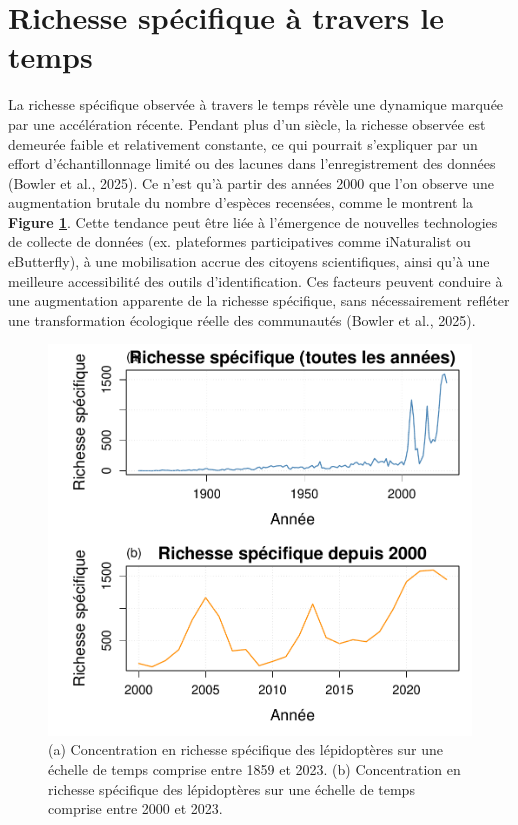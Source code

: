 \documentclass[9pt,twocolumn,twoside,]{pnas-new}
\begin{document}
\section*{Richesse spécifique à travers le
temps}\label{richesse-spuxe9cifique-uxe0-travers-le-temps}

La richesse spécifique observée à travers le temps révèle une dynamique
marquée par une accélération récente. Pendant plus d'un siècle, la
richesse observée est demeurée faible et relativement constante, ce qui
pourrait s'expliquer par un effort d'échantillonnage limité ou des
lacunes dans l'enregistrement des données (Bowler et al., 2025). Ce
n'est qu'à partir des années 2000 que l'on observe une augmentation
brutale du nombre d'espèces recensées, comme le montrent la
\textbf{Figure \ref{fig:fig_richesse_temporelle}}. Cette tendance peut
être liée à l'émergence de nouvelles technologies de collecte de données
(ex. plateformes participatives comme iNaturalist ou eButterfly), à une
mobilisation accrue des citoyens scientifiques, ainsi qu'à une meilleure
accessibilité des outils d'identification. Ces facteurs peuvent conduire
à une augmentation apparente de la richesse spécifique, sans
nécessairement refléter une transformation écologique réelle des
communautés (Bowler et al., 2025).

\begin{figure}[H]

{\centering \includegraphics[width=0.8\linewidth]{rapport_final_BIO500_files/figure-latex/fig_richesse_temporelle-1} 

}

\caption{\label{fig:fig_richesse_temporelle}(a) Concentration en richesse spécifique des lépidoptères sur une échelle de temps comprise entre 1859 et 2023. (b) Concentration en richesse spécifique des lépidoptères sur une échelle de temps comprise entre 2000 et 2023.}\label{fig:fig_richesse_temporelle}
\end{figure}
\end{document}
